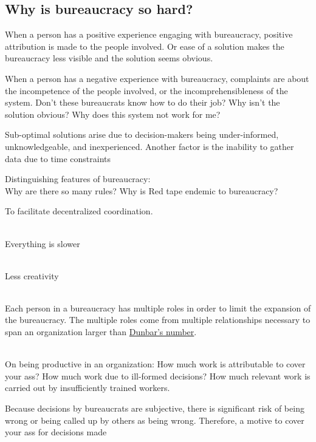 \subsection{Why is bureaucracy so hard?}

When a person has a positive experience engaging with bureaucracy, positive attribution is made to the people involved. Or ease of a solution makes the bureaucracy less visible and the solution seems obvious. 


When a person has a negative experience with bureaucracy, complaints are about the incompetence of the people involved, or the incomprehensibleness of the system. Don't these bureaucrats know how to do their job? Why isn't the solution obvious? Why does this system not work for me?


Sub-optimal solutions arise due to decision-makers being under-informed, unknowledgeable, and inexperienced. Another factor is the inability to gather data due to time constraints


Distinguishing features of bureaucracy:
\ \\

Why are there so many rules? Why is Red tape endemic to bureaucracy?

To facilitate decentralized coordination. 

\ \\

Everything is slower

\ \\

Less creativity

\ \\

Each person in a bureaucracy has multiple roles in order to limit the expansion of the bureaucracy. The multiple roles come from multiple relationships necessary to span an organization larger than \href{https://en.wikipedia.org/wiki/Dunbar\%27s_number}{Dunbar's number}. 

\ \\

On being productive in an organization:
How much work is attributable to cover your ass? How much work due to ill-formed decisions? How much relevant work is carried out by insufficiently trained workers. 

Because decisions by bureaucrats are subjective, there is significant risk of being wrong or being called up by others as being wrong. Therefore, a motive to cover your ass for decisions made

